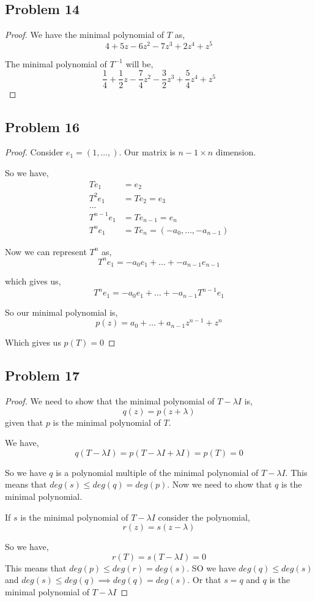 \documentclass[a4paper]{report}
\begin{document}
\subsection*{Problem 14}
\begin{proof}
   We have  the minimal polynomial of $T$ as, 
   $$ 4 + 5z - 6z^2 - 7z^{3} + 2z^{4} + z^{5} $$ 

   The minimal polynomial of $T^{-1}$ will be, 
   $$ \frac{1}{4} + \frac{1}{2}z - \frac{7}{4}z^2 - \frac{3}{2}z^{3} + \frac{5}{4} z^{4} + z^{5} $$ 
\end{proof}

\subsection*{Problem 16}
\begin{proof}
   Consider $e_1 = (1,\dots,)$. Our matrix is $n - 1 \times n$ dimension.

   So we have,  
   \begin{align*}
      Te_1 &= e_2\\
      T^2e_1 &= Te_2 = e_3\\
           \dots\\
      T^{n - 1}e_1 &= Te_{n - 1} = e_{n}\\
      T^{n}e_1 &= Te_{n} = (-a_0,  \dots, -a_{n - 1})
   \end{align*}

   Now we can represent $T^{n}$ as, 
   $$ T^{n}e_1 = -a_0e_1 + \dots + -a_{n - 1}e_{n - 1} $$ 

   which gives us, 
   $$ T^{n}e_1 = -a_0e_1 + \dots + -a_{n - 1}T^{n - 1}e_{1} $$ 

   So our minimal polynomial is, 
   $$p(z) =  a_0 + \dots + a_{n-1}z^{n - 1} + z^{n} $$ 

   Which gives us $p(T) = 0$
\end{proof}

\subsection*{Problem 17}
\begin{proof}
   We need to show that the minimal polynomial of $T - \lambda I$ is, 
   $$ q(z) = p(z + \lambda) $$ given that $p$ is the minimal polynomial of $T$.

   We have, 
   $$ q(T - \lambda I) = p(T - \lambda I + \lambda I) = p(T) = 0 $$ 

   So we have $q$ is a polynomial multiple of the minimal polynomial of $T - \lambda I$. This means that $deg (s) \le deg (q)= deg(p)$. Now we need to show that $q$ is the minimal polynomial.

   If $s$ is the minimal polynomial of $T - \lambda I$ consider the polynomial, 
   $$ r(z) = s(z - \lambda) $$ 

   So we have, 
   $$ r(T) = s(T - \lambda I) = 0 $$ 
   This means that $deg(p) \le deg(r) = deg(s)$. SO we have  $deg(q) \le deg(s)$ and $deg(s) \le deg(q) \implies deg(q) = deg(s)$. Or that $s = q$ and $q$ is the minimal polynomial of $T - \lambda I$


\end{proof}
\end{document}
